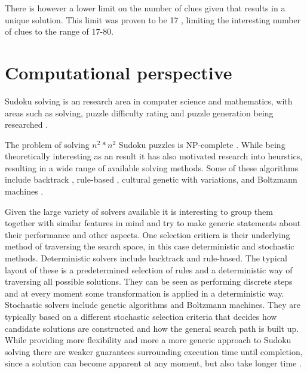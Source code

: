 \documentclass[a4paper,11pt]{kth-mag}
\begin{document}
There is however a lower limit on the number of clues given that results in a unique solution.
This limit was proven to be 17 \cite{17clueProof}, limiting the interesting number of clues to the range of 17-80.

\FloatBarrier
\section{Computational perspective}
Sudoku solving is an research area in computer science and mathematics, with areas such as solving, puzzle difficulty rating and puzzle generation being researched \cite{stochastic, sudokuConstruct, generation}.%

The problem of solving $n^2 * n^2$ Sudoku puzzles is NP-complete \cite{complexity}.
While being theoretically interesting as an result it has also motivated research into heurstics, resulting in a wide range of available solving methods.
Some of these algorithms include backtrack \cite{searchBased}, rule-based \cite{techniques}, cultural genetic with variations\cite{stochastic}, and Boltzmann machines \cite{boltzmann}.

Given the large variety of solvers available it is interesting to group them together with similar features in mind and try to make generic statements about their performance and other aspects.
One selection critiera is their underlying method of traversing the search space, in this case deterministic and stochastic methods.
Deterministic solvers include backtrack and rule-based.
The typical layout of these is a predetermined selection of rules and a deterministic way of traversing all possible solutions.
They can be seen as performing discrete steps and at every moment some transformation is applied in a deterministic way.
Stochastic solvers include genetic algorithms and Boltzmann machines.
They are typically based on a different stochastic selection criteria that decides how candidate solutions are constructed and how the general search path is built up.
While providing more flexibility and more a more generic approach to Sudoku solving there are weaker guarantees surrounding execution time until completion, since a solution can become apparent at any moment, but also take longer time \cite{stochastic}.

\FloatBarrier
\end{document}
